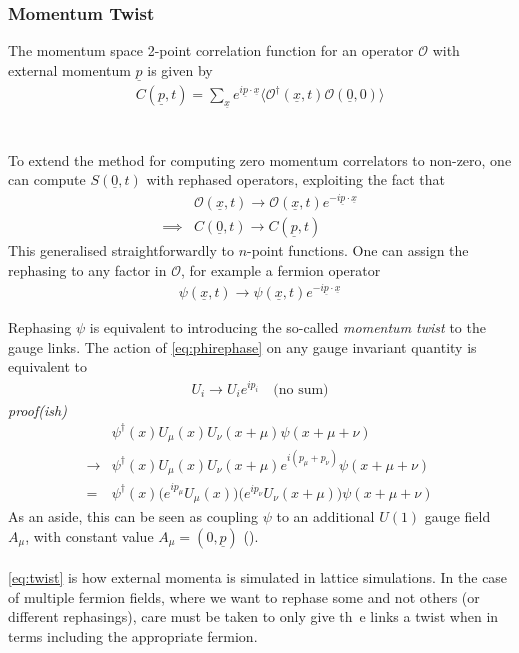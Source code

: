 \subsubsection{Momentum Twist}

The momentum space 2-point correlation function for an operator $\mathcal{O}$ with external momentum $\underline{p}$ is given by
\begin{align}
  C(\underline{p},t) = \sum_{\underline{x}} e^{i\underline{p}\cdot\underline{x}} \langle \mathcal{O}^{\dagger} (\underline{x},t) \mathcal{O}(\underline{0},0) \rangle
\end{align}
\\ \\
To extend the method for computing zero momentum correlators to non-zero, one can compute $S(\underline{0},t)$ with rephased operators, exploiting the fact that
\begin{align}
  \label{eq:phirephase}
  &\mathcal{O}(\underline{x},t) \rightarrow \mathcal{O}(\underline{x},t)e^{-i\underline{p}\cdot\underline{x}} \\
  \implies &C(\underline{0},t) \rightarrow C(\underline{p},t)
\end{align}
This generalised straightforwardly to $n$-point functions. One can assign the rephasing to any factor in $\mathcal{O}$, for example a fermion operator
\begin{align}
  \psi(\underline{x},t) \rightarrow \psi(\underline{x},t)e^{-i\underline{p}\cdot\underline{x}}
\end{align}

Rephasing $\psi$ is equivalent to introducing the so-called {\it{momentum twist}} to the gauge links. The action of \eqref{eq:phirephase} on any gauge invariant quantity is equivalent to
\begin{align}
  U_i \rightarrow U_i e^{ip_i}\quad\text{(no sum)}
  \label{eq:twist}
\end{align}
    {\it{proof(ish)}}
    \begin{align}
      &\psi^{\dagger}(x) U_{\mu}(x) U_{\nu}(x+\mu) \psi(x+\mu+\nu) \\
      \rightarrow &\psi^{\dagger}(x)U_{\mu}(x) U_{\nu}(x+\mu) e^{i(p_{\mu}+p_{\nu})}\psi(x+\mu+\nu) \\
      = &\psi^{\dagger}(x) \big( e^{ip_{\mu}}U_{\mu}(x) \big) \big( e^{ip_{\nu}}U_{\nu}(x+\mu) \big) \psi(x+\mu+\nu)
    \end{align}
    As an aside, this can be seen as coupling $\psi$ to an additional $U(1)$ gauge field $A_{\mu}$, with constant value $A_{\mu} = ( 0, \underline{p} )$ ({\color{red}{ref!}}).
    \\ \\
    \eqref{eq:twist} is how external momenta is simulated in lattice simulations. In the case of multiple fermion fields, where we want to rephase some and not others (or different rephasings), care must be taken to only give th\
    e links a twist when in terms including the appropriate fermion.

